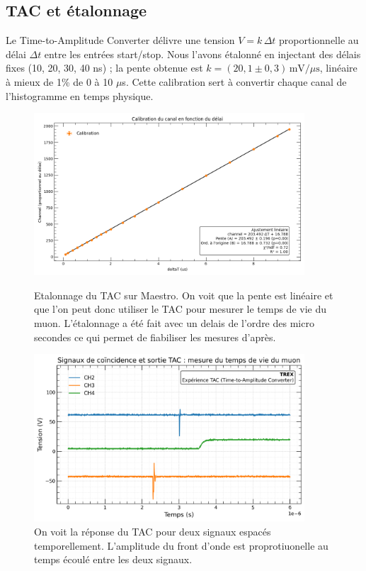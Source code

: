 \documentclass[a4paper,12pt,twoside]{article}
\begin{document}
\subsection*{TAC et étalonnage}
Le Time-to-Amplitude Converter délivre une tension $V=k\,\Delta t$ proportionnelle au délai $\Delta t$ entre les entrées start/stop.  
Nous l'avons étalonné en injectant des délais fixes (10, 20, 30, 40 ns) ; la pente obtenue est  
$k=(20,1\pm0,3)\,\text{mV}/\mu\text{s}$, linéaire à mieux de 1\% de 0 à 10 $\mu$s.  
Cette calibration sert à convertir chaque canal de l’histogramme en temps physique.

\begin{figure}[!h]
  \begin{minipage}{0.45\textwidth}
    \centering
  \includegraphics[width=0.9\textwidth]{Images/Calibration_TAC.png}
  \caption{Etalonnage du TAC sur Maestro. On voit que la pente est linéaire et que l'on peut donc utiliser le TAC pour mesurer le temps de vie du muon. L'étalonnage a été fait avec un delais de l'ordre des micro secondes ce qui permet de fiabiliser les mesures d'après.}
  \label{fig:callibration_TAC}
  \end{minipage}
  \hfill
  \begin{minipage}{0.45\textwidth}
    \centering
    \includegraphics[width=0.9\textwidth]{Images/TAC.png}
    \caption{On voit la réponse du TAC pour deux signaux espacés temporellement.
    L'amplitude du front d'onde est proprotiuonelle au temps écoulé entre les deux signaux.}
    \label{fig:verre_au_plomb}
  \end{minipage}
\end{figure}
\end{document}
